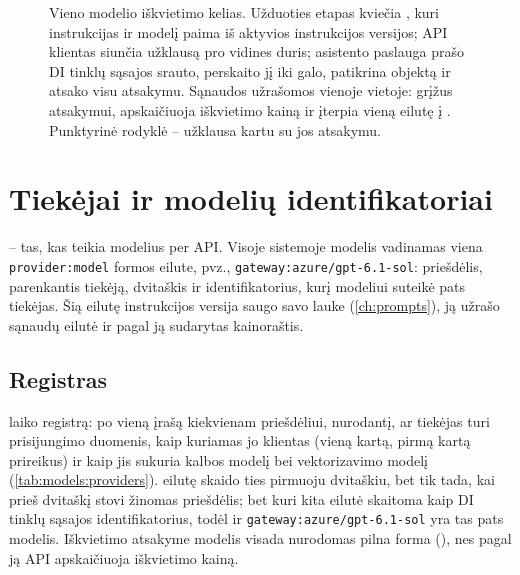 \begin{figure}[H]
\actorlegend
\caption{Vieno modelio iškvietimo kelias. Užduoties etapas kviečia , kuri
instrukcijas ir modelį paima iš aktyvios instrukcijos versijos; API klientas siunčia užklausą
pro vidines duris; asistento paslauga prašo DI tinklų sąsajos srauto, perskaito jį iki galo,
patikrina objektą ir atsako visu atsakymu. Sąnaudos užrašomos vienoje vietoje: grįžus
atsakymui,  apskaičiuoja iškvietimo kainą ir įterpia vieną eilutę į
. Punktyrinė rodyklė -- užklausa kartu su jos atsakymu.}\label{fig:models:path}
\end{figure}


\section{Tiekėjai ir modelių identifikatoriai}\label{sec:models:providers}

 -- tas, kas teikia modelius per API. Visoje sistemoje modelis vadinamas viena
\texttt{provider:model} formos eilute, pvz., \texttt{gateway:azure/gpt-6.1-sol}: priešdėlis,
parenkantis tiekėją, dvitaškis ir identifikatorius, kurį modeliui suteikė pats tiekėjas. Šią
eilutę instrukcijos versija saugo savo lauke  (\cref{ch:prompts}), ją užrašo
sąnaudų eilutė ir pagal ją sudarytas kainoraštis.

\subsection{Registras}

 laiko registrą: po vieną įrašą kiekvienam priešdėliui, nurodantį, ar
tiekėjas turi prisijungimo duomenis, kaip kuriamas jo klientas (vieną kartą, pirmą kartą
prireikus) ir kaip jis sukuria kalbos modelį bei vektorizavimo modelį
(\cref{tab:models:providers}).  eilutę skaido ties pirmuoju dvitaškiu, bet
tik tada, kai prieš dvitaškį stovi žinomas priešdėlis; bet kuri kita eilutė skaitoma kaip DI
tinklų sąsajos identifikatorius, todėl  ir
\texttt{gateway:azure/gpt-6.1-sol} yra tas pats modelis. Iškvietimo atsakyme modelis visada
nurodomas pilna forma (), nes pagal ją API apskaičiuoja iškvietimo kainą.

